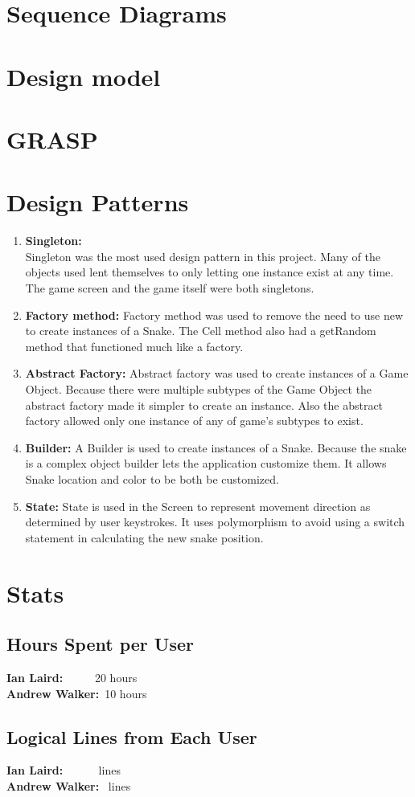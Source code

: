 \documentclass[titlepage]{article}
\begin{document}
	
	
	\section{Sequence Diagrams}
	
	\section{Design model}
	
	\section{GRASP}
	
	\section{Design Patterns}
		\begin{enumerate}
			\item \textbf{Singleton:}\\
				Singleton was the most used design pattern in this project. Many of the objects used lent themselves to only letting one instance exist at any
				time. The game screen and the game itself were both singletons.
			\item \textbf{Factory method:}
				Factory method was used to remove the need to use new to create instances of a Snake. The Cell method also had a getRandom method that functioned much like a factory.
			\item \textbf{Abstract Factory:}
				Abstract factory was used to create instances of a Game Object. Because there were multiple subtypes of the Game Object the abstract factory made it simpler to create an instance. Also the abstract factory allowed only one instance of any of game's subtypes to exist.
			\item \textbf{Builder:}
				A Builder is used to create instances of a Snake. Because the snake is a complex object builder lets the application customize them. It allows Snake location and color to be both be customized.
			\item \textbf{State:}
				State is used in the Screen to represent movement direction as determined by user keystrokes. It uses polymorphism to avoid using a switch statement in calculating the new snake position.
		\end{enumerate}
	\section{Stats}
	\subsection{Hours Spent per User}
	\textbf{Ian Laird:} ~~~~~20 hours\\
	\textbf{Andrew Walker:}~10 hours
	\subsection{Logical Lines from Each User}
	\textbf{Ian Laird:} ~~~~~ lines\\
	\textbf{Andrew Walker:}~ lines
\end{document}
